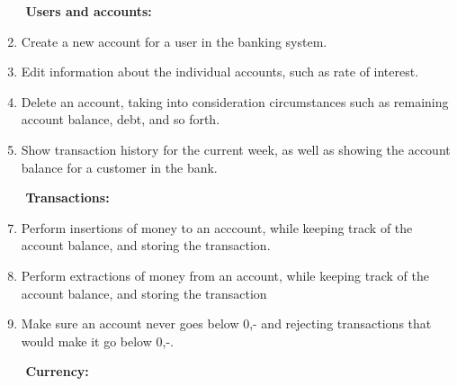 \begin{mdframed}[backgroundcolor=black!5]
\begin{enumerate}
\item[$ $] \textbf{Users and accounts:}
\item Create a new account for a user in the banking system.

\item Edit information about the individual accounts, such as rate of interest.

\item Delete an account, taking into consideration circumstances such as remaining account balance, debt, and so forth.

\item Show transaction history for the current week, as well as showing the account balance for a customer in the bank.

\item[$ $] \textbf{Transactions:}

\item Perform insertions of money to an acccount, while keeping track of the account balance, and storing the transaction.

\item Perform extractions of money from an account, while keeping track of the account balance, and storing the transaction

\item Make sure an account never goes below 0,- and rejecting transactions that would make it go below 0,-.


\item[$ $] \textbf{Currency:}


\end{enumerate}
\end{mdframed}
